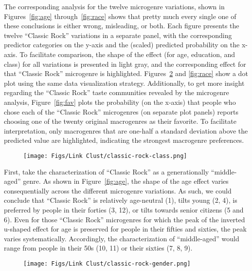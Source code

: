 The corresponding analysis for the twelve microgenre variations, shown in Figures~\ref{fig:age} through~\ref{fig:race} shows that pretty much every single one of these conclusions is either wrong, misleading, or both. Each figure presents the twelve ``Classic Rock'' variations in a separate panel, with the corresponding predictor categories on the y-axis and the (scaled) predicted probability on the x-axis. To facilitate comparison, the shape of the effect (for age, education, and class) for all variations is presented in light gray, and the corresponding effect for that ``Classic Rock'' microgenre is highlighted. Figures~\ref{fig:gender} and \ref{fig:race} show a dot plot using the same data visualization strategy. Additionally, to get more insight regarding the ``Classic Rock'' taste communities revealed by the microgenre analysis, Figure~\ref{fig:fav} plots the probability (on the x-axis) that people who chose each of the ``Classic Rock'' microgenres (on separate plot panels) reports choosing one of the twenty original macrogenres as their favorite. To facilitate interpretation, only macrogenres that are one-half a standard deviation above the predicted value are highlighted, indicating the strongest macrogenre preferences.

\begin{figure}[ht!]
    \centering
    \texttt{[image: Figs/Link Clust/classic-rock-class.png]}
    \caption{}
    \label{fig:class}
\end{figure}
 
First, take the characterization of ``Classic Rock'' as a generationally ``middle-aged'' genre. As shown in Figure~\ref{fig:age}, the shape of the age effect varies consequentially across the different microgenre variations. As such, we could conclude that ``Classic Rock'' is relatively age-neutral (1), tilts young (2, 4), is preferred by people in their forties (3, 12), or tilts towards senior citizens (5 and 6). Even for those ``Classic Rock'' microgenres for which the peak of the inverted u-shaped effect for age is preserved for people in their fifties and sixties, the peak varies systematically. Accordingly, the characterization of ``middle-aged'' would range from people in their 50s (10, 11) or their sixties (7, 8, 9). 

\begin{figure}[ht!]
    \centering
    \texttt{[image: Figs/Link Clust/classic-rock-gender.png]}
    \caption{}
    \label{fig:gender}
\end{figure}

